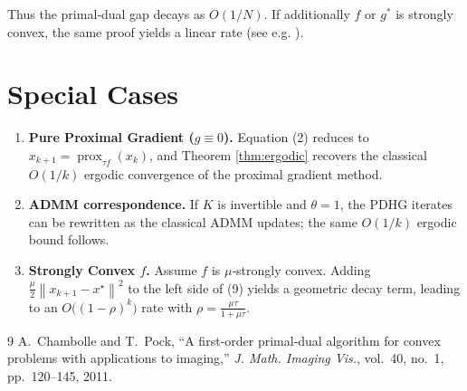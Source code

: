 \documentclass{article}
\newcommand{\prox}{\operatorname{prox}}
\newcommand{\norm}[1]{\left\|#1\right\|}
\begin{document}
Thus the primal‑dual gap decays as $O(1/N)$.  If additionally $f$ or $g^{*}$ is strongly convex, the same proof yields a linear rate (see e.g. \cite{chambolle2011first}).

\section*{Special Cases}
\begin{enumerate}
\item \textbf{Pure Proximal Gradient ($g\equiv0$).}  
Equation (2) reduces to $x_{k+1}= \prox_{\tau f}(x_{k})$, and Theorem \ref{thm:ergodic} recovers the classical $O(1/k)$ ergodic convergence of the proximal gradient method.
\item \textbf{ADMM correspondence.}  
If $K$ is invertible and $\theta=1$, the PDHG iterates can be rewritten as the classical ADMM updates; the same $O(1/k)$ ergodic bound follows.
\item \textbf{Strongly Convex $f$.}  
Assume $f$ is $\mu$‑strongly convex. Adding $\frac{\mu}{2}\norm{x_{k+1}-x^{\star}}^{2}$ to the left side of (9) yields a geometric decay term, leading to an $O\bigl((1-\rho)^{k}\bigr)$ rate with $\rho=\frac{\mu\tau}{1+\mu\tau}$.
\end{enumerate}

\begin{thebibliography}{9}
A.~Chambolle and T.~Pock, ``A first‑order primal‑dual algorithm for convex problems with 
applications to imaging,'' \emph{J. Math. Imaging Vis.}, vol.~40, no.~1, pp.~120–145, 2011.
\end{thebibliography}
\end{document}
